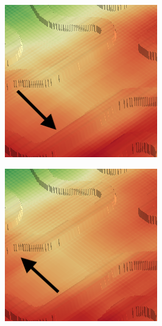 \documentclass[../document.tex]{subfiles}
\begin{document}
\begin{figure} [htbp]
\begin{subfigure}[b]{0.23\textwidth}
  \end{subfigure}
  \begin{subfigure}[b]{0.23\textwidth}
    \includegraphics[width=\linewidth]{../img/4/traversability/bars/tunnel/-0-crop.png}
  \end{subfigure}
  \begin{subfigure}[b]{0.23\textwidth}
      \includegraphics[width=\linewidth]{../img/4/traversability/bars/tunnel/-180-crop.png}  

\end{subfigure}
\end{figure}
\end{document}
